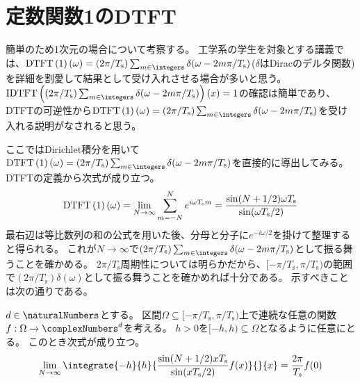     \section{定数関数1のDTFT}
        \label{定数関数1のDTFT}
        簡単のため1次元の場合について考察する。
        工学系の学生を対象とする講義では、$\DTFTwithArg{1}{\omega} = (2\pi/T_\text{s})\sum_{m\in\integers}\delta(\omega-2m\pi/T_\text{s})$($\delta$はDiracのデルタ関数)を詳細を割愛して結果として受け入れさせる場合が多いと思う。
        $\IDTFTwithArg{(2\pi/T_\text{s})\sum_{m\in\integers}\delta(\omega-2m\pi/T_\text{s})}{x}=1$の確認は簡単であり、DTFTの可逆性から$\DTFTwithArg{1}{\omega} = (2\pi/T_\text{s})\sum_{m\in\integers}\delta(\omega-2m\pi/T_\text{s})$を受け入れる説明がなされると思う。
        \par
        ここではDirichlet積分を用いて$\DTFTwithArg{1}{\omega} = (2\pi/T_\text{s})\sum_{m\in\integers}\delta(\omega-2m\pi/T_\text{s})$を直接的に導出してみる。
        DTFTの定義から次式が成り立つ。
        \[
            \mathrm{DTFT}\left(1\right)\left(\omega\right) = \lim_{N\to\infty} \sum_{m=-N}^N e^{i\omega T_\text{s} m} = \frac{\sin(N+1/2)\omega T_\text{s}}{\sin(\omega T_\text{s}/2)}
        \]
        最右辺は等比数列の和の公式を用いた後、分母と分子に$e^{-i\omega/2}$を掛けて整理すると得られる。
        これが$N\to\infty$で$(2\pi/T_\text{s})\sum_{m\in\integers}\delta(\omega-2m\pi/T_\text{s})$として振る舞うことを確かめる。
        $2\pi/T_\text{s}$周期性については明らかだから、$[-\pi/T_\text{s},\pi/T_\text{s})$の範囲で$(2\pi/T_\text{s})\delta(\omega)$として振る舞うことを確かめれば十分である。
        示すべきことは次の通りである。
        \begin{shadebox}
            $d\in\naturalNumbers$とする。
            区間$\Omega \subseteq [-\pi/T_\text{s},\pi/T_\text{s})$上で連続な任意の関数$f:\Omega\to\complexNumbers^d$を考える。
            $h>0$を$[-h,h) \subseteq \Omega$となるように任意にとる。
            このとき次式が成り立つ。
            \[
                \lim_{N\to\infty} \integrate{-h}{h}{\frac{\sin(N+1/2)x T_\text{s}}{\sin(x T_\text{s}/2)} f(x)}{}{x} = \frac{2\pi}{T_\text{s}} f(0)
            \]
        \end{shadebox}

